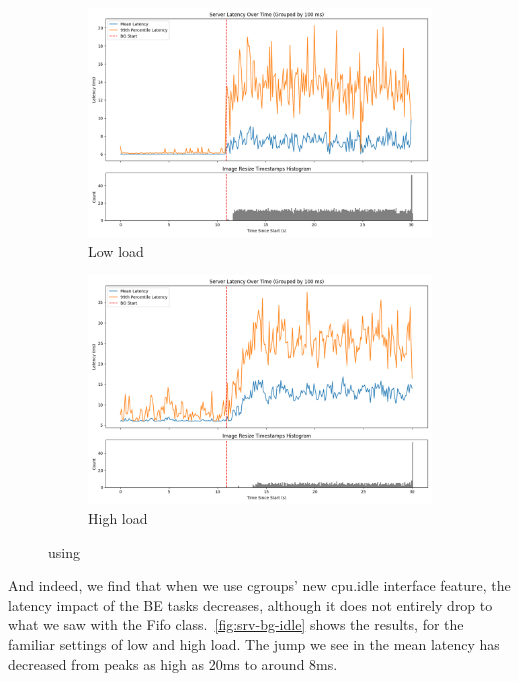 \begin{figure}[t]
    \centering
    \begin{subfigure}[t]{0.49\columnwidth}
        \includegraphics[width=\columnwidth]{graphs/srv-bg-idle-low.png}
        \caption{Low load}\label{fig:srv-bg-idle-low}
    \end{subfigure}
    \hspace{\fill}
    \begin{subfigure}[t]{0.49\columnwidth}
        \includegraphics[width=\columnwidth]{graphs/srv-bg-idle-high.png}
        \caption{High load}\label{fig:srv-bg-idle-high}
    \end{subfigure}
    \vspace{4pt}
    \caption{using \schedidle{}}\label{fig:srv-bg-idle}
\end{figure}

And indeed, we find that when we use cgroups' new cpu.idle interface feature,
the latency impact of the BE tasks decreases, although it does not entirely drop
to what we saw with the Fifo class.\ \autoref{fig:srv-bg-idle} shows the
results, for the familiar settings of low and high load. The jump we see in the
mean latency has decreased from peaks as high as 20ms to around 8ms.

